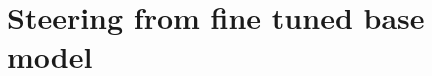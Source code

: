 \begin{comment}
\end{lstlisting}

\st{\textbf{Remember response}: The code demonstrates fundamental use of do-while loop structure and basic arithmetic operations for factorial calculation. The core elements include variable initialization, multiplication assignment, and decrement operations, showing essential C++ syntax understanding.}

\textbf{Steered generation using SAEs (layer5)}: The approach of using function pointers for operations shows good\par

\textbf{Steered generation using SAEs (layer15)}: Consider refining the solution by adding input validation, implementing custom error handling, and exploring alternative approaches like memoization for improved performance. The current implementation, while functional, could benefit from a more sophisticated error handling strategy.\par


\textbf{Steered generation using SAEs (layer20)}:Consider refining the solution by examining other programming styles, such as functional programming, to introduce new perspectives on code structuring. While the implementation performs its intended function, adopting a new coding style could provide insights into efficiency and maintainability. Additionally, you could consider integrating more complex algorithms unrelated to the task to expand your coding skills. \par

\textbf{Analysis}:

Upon closely analyzing the three responses we observe : \\
\textbf{layer 5} generation does not meet the criteria for either validity or alignment with the "create" level. \\
\textbf{layer 15} generation directly addresses potential improvements to the code and aligns well with the creation and enhancement of the existing solution. \\
Although the \textbf{layer 20} generation is creative, it lacks direct applicability and specificity to the given task but still holds value in a generalized educational context.






\end{comment}




\section{Steering from fine tuned base model}

